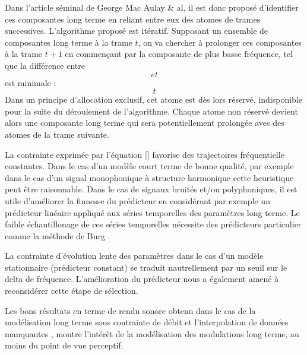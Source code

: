 Dans l'article séminal de George Mac Aulay \& al, il est donc proposé \og d'identifier \fg ces composantes long terme en reliant entre eux des atomes de trames successives. L'algorithme proposé est itératif. Supposant un ensemble de composantes long terme à la trame $t$, on va chercher à prolonger ces composantes à la trame $t+1$ en commençant par la composante de plus basse fréquence, tel que la différence entre $$ et $$ est minimale :
\begin{equation}
t
\end{equation}
Dans un principe d'allocation exclusif, cet atome est dès lors réservé, indisponible pour la suite du déroulement de l'algorithme. Chaque atome non réservé devient alors une composante long terme qui sera potentiellement prolongée aves des atomes de la trame suivante.

La contrainte exprimée par l'équation \ref{} favorise des trajectoires fréquentielle constantes. Dans le cas d'un modèle court terme de bonne qualité, par exemple dans le cas d'un signal monophonique à structure harmonique cette heuristique peut être raisonnable. Dans le cas de signaux bruités et/ou polyphoniques, il est utile d'améliorer la finnesse du prédicteur en considérant par exemple un prédicteur linéaire appliqué aux séries temporelles des paramètres long terme. Le faible échantillonage de ces séries temporelles nécessite des prédicteurs particulier comme la méthode de Burg \cite{}.

La contrainte d'évolution lente des paramètres dans le cas d'un modèle stationnaire (prédicteur constant) se traduit nautrellement par un seuil sur le delta de fréquence. L'amélioration du prédicteur nous a également amené à reconsidérer cette étape de sélection.

Les bons résultats en terme de rendu sonore obtenu dans le cas  de la modélisation long terme sous contrainte de débit \cite{lagrangeTaslp06} et l'interpolation de données manquantes \cite{lagrangeJaes05}, montre l'intérêt de la modélisation des modulations long terme, au moins du point de vue perceptif.

